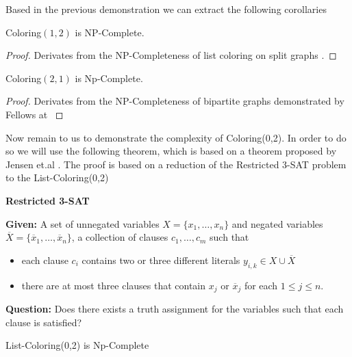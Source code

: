 \documentclass[9pt]{../document-types/entcs} \usepackage{../document-types/entcsmacro}
\begin{document}
Based in the previous demonstration we can extract the following corollaries

\begin{corollary}
  {\sc Coloring$(1,2)$} is NP-Complete.
\end{corollary}
\begin{proof}
  Derivates from the NP-Completeness of list coloring on split graphs \cite{jansen1997}.
\end{proof}

\begin{corollary}
  {\sc Coloring$(2,1)$ is Np-Complete.}
\end{corollary}
\begin{proof}
  Derivates from the NP-Completeness of bipartite graphs demonstrated by Fellows at \cite{fellows07}
\end{proof}

Now remain to us to demonstrate the complexity of {\sc Coloring(0,2)}. In order to do so we will use the following theorem, which is based on a theorem proposed by Jensen et.al \cite{jansen1999}. The proof is based on a reduction of the {\sc Restricted 3-SAT} problem to the {\sc List-Coloring(0,2)}

\textbf{Restricted 3-SAT}

\textbf{Given:} A set of unnegated variables $X = \{x_1,\ldots,x_n\}$ and negated variables  $\overline{X} = \{\overline{x}_1,\ldots,\overline{x}_n\}$, a collection of clauses $c_1,\ldots,c_m$ such that
\begin{itemize}
  \item each clause $c_i$ contains two or three different literals $y_{i,k} \in X \cup \overline{X}$
  \item there are at most three clauses that contain $x_j$ or $\overline{x}_j$ for each $1 \leq j \leq n$.
\end{itemize}

\textbf{Question:}  Does there exists a truth assignment for the variables such that each clause is satisfied?

\begin{theorem}
  {\sc List-Coloring(0,2) is Np-Complete}
\end{theorem}
\end{document}
